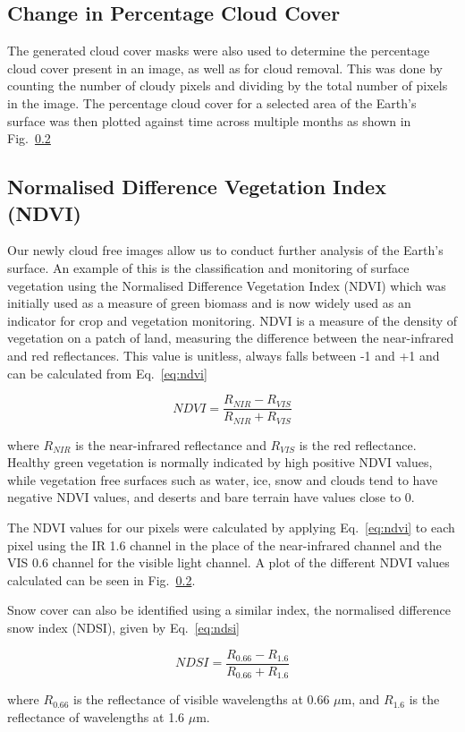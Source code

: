 \subsection{Change in Percentage Cloud Cover}

The generated cloud cover masks were also used to determine the percentage cloud cover present in an image, as well as for cloud removal. This was done by counting the number of cloudy pixels and dividing by the total number of pixels in the image. The percentage cloud cover for a selected area of the Earth's surface was then plotted against time across multiple months as shown in Fig.~\ref{}

\subsection{Normalised Difference Vegetation Index (NDVI)}
Our newly cloud free images allow us to conduct further analysis of the Earth's surface. An example of this is the classification and monitoring of surface vegetation using the Normalised Difference Vegetation Index (NDVI) which was initially used as a measure of green biomass and is now widely used as an indicator for crop and vegetation monitoring. NDVI is a measure of the density of vegetation on a patch of land, measuring the difference between the near-infrared and red reflectances. This value is unitless,  always falls between -1 and +1 and can be calculated from Eq.~\ref{eq:ndvi}

\begin{equation}\label{eq:ndvi}
    NDVI = \frac{R_{NIR}-R_{VIS}}{R_{NIR}+R_{VIS}}
\end{equation}

where $R_{NIR}$ is the near-infrared reflectance and $R_{VIS}$ is the red reflectance.
Healthy green vegetation is normally indicated by high positive NDVI values, while vegetation free surfaces such as water, ice, snow and clouds tend to have negative NDVI values, and deserts and bare terrain have values close to 0.

The NDVI values for our pixels were calculated by applying Eq.~\ref{eq:ndvi} to each pixel using the IR 1.6 channel in the place of the near-infrared channel and the VIS 0.6 channel for the visible light channel. A plot of the different NDVI values calculated can be seen in Fig.~\ref{}.

\par Snow cover can also be identified using a similar index, the normalised difference snow index (NDSI), given by Eq.~\ref{eq:ndsi}

\begin{equation}\label{eq:ndsi}
    NDSI = \frac{R_{0.66}-R_{1.6}}{R_{0.66}+R_{1.6}}
\end{equation}

where $R_{0.66}$ is the reflectance of visible wavelengths at 0.66 $\mu$m, and $R_{1.6}$ is the reflectance of wavelengths at 1.6 $\mu$m.





